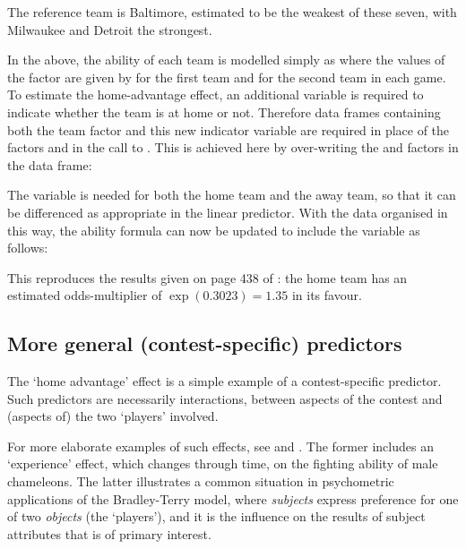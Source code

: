 \Rcodeplaceholder{}

The reference team is Baltimore, estimated to be the weakest of these seven,
with Milwaukee and Detroit the strongest.

In the above, the ability of each team is modelled simply as  where
the values of the factor  are given by  for the
first team and  for the second team in each game. To
estimate the home-advantage effect, an additional variable is required to
indicate whether the team is at home or not. Therefore data frames
containing both the team factor and this new indicator variable are required
in place of the factors  and  in the call to
. This is achieved here by over-writing the  and
 factors in the  data frame:

\Rcodeplaceholder{}

The  variable is needed for both the home team and the
away team, so that it can be differenced as appropriate in the linear
predictor. With the data organised in this way, the ability formula can now be
updated to include the  variable as follows:

\Rcodeplaceholder{}


\vspace*{-0.3cm}

This reproduces the results given on page 438 of \citet{agre:02}: the home team
has an estimated odds-multiplier of $\exp(0.3023) = 1.35$ in its favour.

\vspace*{-0.2cm}

\subsection{More general (contest-specific) predictors}
\label{sec:CEMS}

The `home advantage' effect is a simple
example of a contest-specific predictor.  Such predictors are necessarily
interactions, between aspects of the contest and (aspects of) the two
`players' involved.

For more elaborate examples of such effects, see  and
.  The former includes an `experience' effect, which changes
through time, on the fighting ability of male chameleons.  The latter
illustrates a common situation in psychometric applications of the
Bradley-Terry model, where \emph{subjects} express preference for one of two
\emph{objects} (the `players'), and it is the influence on the results of
subject attributes that is of primary interest.

